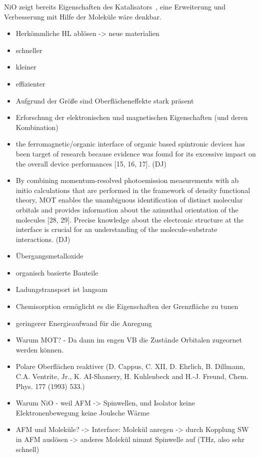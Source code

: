     NiO zeigt bereits Eigenschaften des Katalisators~\cite{kunz_chemisorption_1985}, eine Erweiterung und Verbesserung mit Hilfe der Moleküle wäre denkbar.
\begin{itemize}
    \item Herkömmliche HL ablösen -> neue materialien
    \item schneller
    \item kleiner
    \item effizienter
    \item Aufgrund der Größe sind Oberflächeneffekte stark präsent
    \item Erforschung der elektronischen und magnetischen Eigenschaften (und deren Kombination)
    \item the ferromagnetic/organic interface of organic     based spintronic devices has been target of research because evidence was found for its excessive impact on the overall device performances [15, 16, 17]. (DJ)
    \item By combining momentum-resolved photoemission measurements with ab initio calculations that are performed in the framework of density functional theory, MOT enables the unambiguous identification of distinct molecular orbitals and provides information about the azimuthal orientation of the molecules [28, 29]. Precise knowledge about the electronic structure at the interface is crucial for an understanding of the molecule-substrate interactions. (DJ)
    \item Übergangsmetalloxide
    \item organisch basierte Bauteile
    \item Ladungstransport ist langsam
    \item Chemisorption ermöglicht es die Eigenschaften der Grenzfläche zu tunen
    \item geringerer Energieaufwand für die Anregung
    \item Warum MOT? - Da dann im engen VB die Zustände Orbitalen zugeornet werden können.
    \item Polare Oberflächen reaktiver (D. Cappus, C. XII, D. Ehrlich, B. Dillmann, C.A. Ventrite, Jr., K. AI-Shamery, H. Kuhlenbeck and H.-J. Freund, Chem. Phys. 177 (1993) 533.)
    \item Warum NiO - weil AFM -> Spinwellen, und Isolator keine Elektronenbewegung keine Joulsche Wärme
    \item AFM und Moleküle? -> Interface: Molekül anregen -> durch Kopplung SW in AFM auslösen -> anderes Molekül nimmt Spinwelle auf (THz, also sehr schnell)
\end{itemize}
